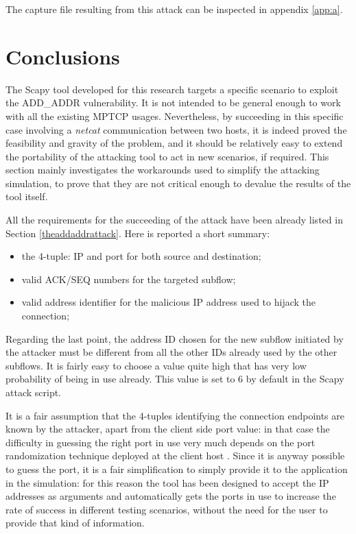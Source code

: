 The capture file resulting from this attack can be inspected in appendix \ref{app:a}.

\section{Conclusions}
\label{limitationsandfuturework}
The Scapy tool developed for this research targets a specific scenario to exploit the ADD\_ADDR vulnerability. It is not intended to be general enough to work with all the existing MPTCP usages. Nevertheless, by succeeding in this specific case involving a \textit{netcat} communication between two hosts, it is indeed proved the feasibility and gravity of the problem, and it should be relatively easy to extend the portability of the attacking tool to act in new scenarios, if required.
This section mainly investigates the workarounds used to simplify the attacking simulation, to prove that they are not critical enough to devalue the results of the tool itself.

All the requirements for the succeeding of the attack have been already listed in Section \ref{theaddaddrattack}. Here is reported a short summary:

\begin{itemize}
\item the 4-tuple: IP and port for both source and destination;
\item valid ACK/SEQ numbers for the targeted subflow;
\item valid address identifier for the malicious IP address used to hijack the connection;
\end{itemize}

Regarding the last point, the address ID chosen for the new subflow initiated by the attacker must be different from all the other IDs already used by the other subflows. It is fairly easy to choose a value quite high that has very low probability of being in use already. This value is set to 6 by default in the Scapy attack script.

It is a fair assumption that the 4-tuples identifying the connection endpoints are known by the attacker, apart from the client side port value: in that case the difficulty in guessing the right port in use very much depends on the port randomization technique deployed at the client host \cite{rfc6056}. Since it is anyway possible to guess the port, it is a fair simplification to simply provide it to the application in the simulation: for this reason the tool has been designed to accept the IP addresses as arguments and automatically gets the ports in use to increase the rate of success in different testing scenarios, without the need for the user to provide that kind of information.

